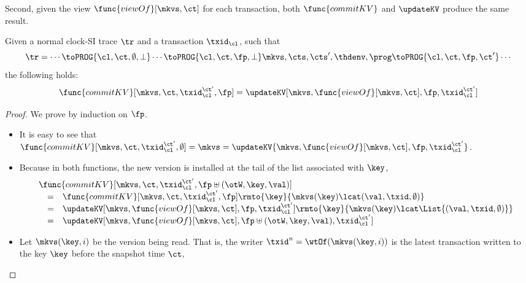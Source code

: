 Second, given the view \( \func{viewOf}[\mkvs,\ct] \) for each transaction, 
both \( \func{commitKV} \) and \( \updateKV \) produce the same result.
\begin{lemma}
    Given a normal clock-SI trace \( \tr \) and a transaction \( \txid_\cl \), such that
    \[
        \tr = \cdots \toPROG{\cl, \ct, \emptyset, \perp} \cdots \toPROG{\cl, \ct, \fp, \perp} \mkvs, \cts, \cts', \thdenv, \prog  \toPROG{\cl, \ct, \fp, \ct'} \cdots
    \] 
    the following holds:
    \[
        \func{commitKV}[\mkvs,\ct,\txid_\cl^{\ct'},\fp] = \updateKV[\mkvs, \func{viewOf}[\mkvs, \ct],\fp, \txid_\cl^{\ct'}] 
    \]
\end{lemma}
\begin{proof}
    We prove by induction on \( \fp \).
    \begin{itemize}
        \item \caseB{\( \fp = \emptyset \)}
            It is easy to see that \( \func{commitKV}[\mkvs,\ct,\txid_\cl^{\ct'},\emptyset] = \mkvs =  \updateKV{\mkvs, \func{viewOf}[\mkvs, \ct],\fp, \txid_\cl^{\ct'}} \).
        \item \caseI{\( \fp \uplus (\otW, \key, \val) \)}
            Because in both functions, the new version is installed at the tail of the list associated with \( \key \),
            \[
                \begin{array}{@{}l@{}}
                \func{commitKV}[\mkvs,\ct,\txid_\cl^{\ct'},\fp \uplus (\otW, \key, \val)]  \\
                \quad \begin{array}[t]{@{}c l@{}}
                = &
                \func{commitKV}[\mkvs,\ct,\txid_\cl^{\ct'},\fp]\rmto{\key}{\mkvs(\key) \lcat (\val, \txid, \emptyset)} \\
                = & 
                \updateKV[\mkvs,\func{viewOf}[\mkvs,\ct],\fp,\txid_\cl^{\ct'}]\rmto{\key}{\mkvs(\key) \lcat \List{(\val, \txid, \emptyset)}} \\
                = & 
                \updateKV[\mkvs,\func{viewOf}[\mkvs,\ct],\fp \uplus (\otW, \key, \val),\txid_\cl^{\ct'}]
                \end{array}
                \end{array}
            \]
        \item \caseI{\( \fp \uplus (\otR, \key, \val) \)}
            Let \( \mkvs(\key,i) \) be the version being read.
            That is, the writer \( \txid^n = \wtOf(\mkvs(\key,i)) \)
            is the latest transaction written to the key \( \key \) before the snapshot time \( \ct \),

\end{itemize}
\end{proof}
